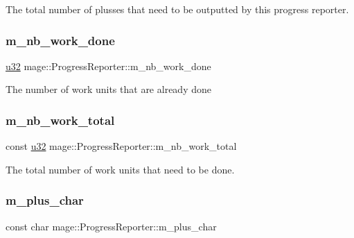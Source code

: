 The total number of plusses that need to be outputted by this progress reporter. \hypertarget{classmage_1_1_progress_reporter_a46d9622fbcb30bcc142a3f028365505f}{}\label{classmage_1_1_progress_reporter_a46d9622fbcb30bcc142a3f028365505f} 
\subsubsection{\texorpdfstring{m\+\_\+nb\+\_\+work\+\_\+done}{m\_nb\_work\_done}}
{\footnotesize\ttfamily \hyperlink{namespacemage_af2b398bf98eb10351f49cad73fe2cc73}{u32} mage\+::\+Progress\+Reporter\+::m\+\_\+nb\+\_\+work\+\_\+done\hspace{0.3cm}{\ttfamily [private]}}

The number of work units that are already done \hypertarget{classmage_1_1_progress_reporter_aca53f49ef3f6a9773a1cda7e74790267}{}\label{classmage_1_1_progress_reporter_aca53f49ef3f6a9773a1cda7e74790267} 
\subsubsection{\texorpdfstring{m\+\_\+nb\+\_\+work\+\_\+total}{m\_nb\_work\_total}}
{\footnotesize\ttfamily const \hyperlink{namespacemage_af2b398bf98eb10351f49cad73fe2cc73}{u32} mage\+::\+Progress\+Reporter\+::m\+\_\+nb\+\_\+work\+\_\+total\hspace{0.3cm}{\ttfamily [private]}}

The total number of work units that need to be done. \hypertarget{classmage_1_1_progress_reporter_ab3c8d12e79e63ae2b99fde8d6627c230}{}\label{classmage_1_1_progress_reporter_ab3c8d12e79e63ae2b99fde8d6627c230} 
\subsubsection{\texorpdfstring{m\+\_\+plus\+\_\+char}{m\_plus\_char}}
{\footnotesize\ttfamily const char mage\+::\+Progress\+Reporter\+::m\+\_\+plus\+\_\+char\hspace{0.3cm}{\ttfamily [private]}}

